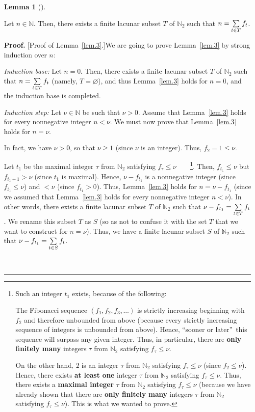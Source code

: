 \documentclass[numbers=enddot,12pt,final,onecolumn,notitlepage]{scrartcl}%
\numberwithin{exer}{section}
\theoremstyle{definition}
\newtheorem{lem}[theo]{Lemma}
\newenvironment{lemma}[1][]
{\begin{lem}[#1]\begin{leftbar}}
{\end{leftbar}\end{lem}}
\newenvironment{proof}[1][Proof]{\noindent\textbf{#1.} }{\ \rule{0.5em}{0.5em}}
\let\sumnonlimits\sum
\renewcommand{\sum}{\sumnonlimits\limits}
\begin{document}
\begin{lemma}
[existence part of the Zeckendorf theorem]\label{lem.3} Let $n \in\mathbb{N}$.
Then, there exists a finite lacunar subset $T$ of $\mathbb{N}_{2}$ such that
$n=\sum\limits_{t\in T}f_{t}$.
\end{lemma}

\begin{proof}
[Proof of Lemma~\ref{lem.3}.]We are going to prove Lemma~\ref{lem.3} by strong
induction over $n$:

\textit{Induction base:} Let $n=0$. Then, there exists a finite lacunar subset
$T$ of $\mathbb{N}_{2}$ such that $n=\sum\limits_{t\in T}f_{t}$ (namely,
$T=\varnothing$), and thus Lemma~\ref{lem.3} holds for $n=0$, and the
induction base is completed.

\textit{Induction step:} Let $\nu\in\mathbb{N}$ be such that $\nu>0$. Assume
that Lemma~\ref{lem.3} holds for every nonnegative integer $n<\nu$. We must
now prove that Lemma~\ref{lem.3} holds for $n=\nu$.

In fact, we have $\nu>0$, so that $\nu\geq1$ (since $\nu$ is an integer).
Thus, $f_{2}=1\leq\nu$.

Let $t_{1}$ be the maximal integer $\tau$ from $\mathbb{N}_{2}$ satisfying
$f_{\tau}\leq\nu$\ \ \ \ \footnote{Such an integer $t_{1}$ exists, because of
the following:
\par
The Fibonacci sequence $\left(  f_{1},f_{2},f_{3},\ldots\right)  $ is strictly
increasing beginning with $f_{2}$ and therefore unbounded from above (because
every strictly increasing sequence of integers is unbounded from above).
Hence, \textquotedblleft sooner or later\textquotedblright\ this sequence will
surpass any given integer. Thus, in particular, there are \textbf{only
finitely many} integers $\tau$ from $\mathbb{N}_{2}$ satisfying $f_{\tau}%
\leq\nu$.
\par
On the other hand, $2$ is an integer $\tau$ from $\mathbb{N}_{2}$ satisfying
$f_{\tau}\leq\nu$ (since $f_{2}\leq\nu$). Hence, there exists \textbf{at least
one} integer $\tau$ from $\mathbb{N}_{2}$ satisfying $f_{\tau}\leq\nu$. Thus,
there exists a \textbf{maximal integer} $\tau$ from $\mathbb{N}_{2}$
satisfying $f_{\tau}\leq\nu$ (because we have already shown that there are
\textbf{only finitely many} integers $\tau$ from $\mathbb{N}_{2}$ satisfying
$f_{\tau}\leq\nu$). This is what we wanted to prove.}. Then, $f_{t_{1}}\leq
\nu$ but $f_{t_{1}+1}>\nu$ (since $t_{1}$ is maximal). Hence, $\nu-f_{t_{1}}$
is a nonnegative integer (since $f_{t_{1}}\leq\nu$) and $<\nu$ (since
$f_{t_{1}}>0$). Thus, Lemma~\ref{lem.3} holds for $n=\nu-f_{t_{1}}$ (since we
assumed that Lemma~\ref{lem.3} holds for every nonnegative integer $n<\nu$).
In other words, there exists a finite lacunar subset $T$ of $\mathbb{N}_{2}$
such that $\nu-f_{t_{1}}=\sum\limits_{t\in T}f_{t}$. We rename this subset $T$
as $S$ (so as not to confuse it with the set $T$ that we want to construct for
$n=\nu$). Thus, we have a finite lacunar subset $S$ of $\mathbb{N}_{2}$ such
that $\nu-f_{t_{1}}=\sum\limits_{t\in S}f_{t}$.


\end{proof}
\end{document}
